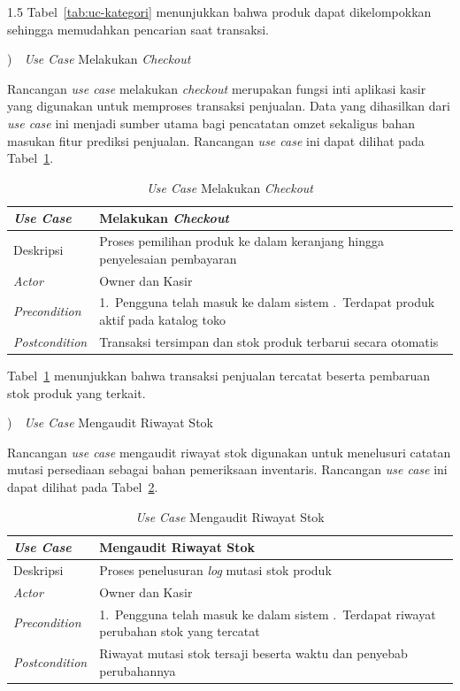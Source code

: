 \documentclass[12pt, a4paper, onecolumn, oneside]{report}
\begin{document}
\begin{spacing}{1.5}
Tabel~\ref{tab:uc-kategori} menunjukkan bahwa produk dapat dikelompokkan sehingga memudahkan pencarian saat transaksi.

)~~\textit{Use Case} Melakukan \textit{Checkout}

Rancangan \textit{use case} melakukan \textit{checkout} merupakan fungsi inti aplikasi kasir yang digunakan untuk memproses transaksi penjualan. Data yang dihasilkan dari \textit{use case} ini menjadi sumber utama bagi pencatatan omzet sekaligus bahan masukan fitur prediksi penjualan. Rancangan \textit{use case} ini dapat dilihat pada Tabel~\ref{tab:uc-checkout}.

\begin{table}[H]
\centering
\caption{\textit{Use Case} Melakukan \textit{Checkout}}
\label{tab:uc-checkout}
\begin{tabularx}{\textwidth}{|p{3.2cm}|X|}
\hline
\textbf{\textit{Use Case}} & \textbf{Melakukan \textit{Checkout}} \\ \hline
Deskripsi & Proses pemilihan produk ke dalam keranjang hingga penyelesaian pembayaran \\ \hline
\textit{Actor} & Owner dan Kasir \\ \hline
\textit{Precondition} & 1.~Pengguna telah masuk ke dalam sistem \newline 2.~Terdapat produk aktif pada katalog toko \\ \hline
\textit{Postcondition} & Transaksi tersimpan dan stok produk terbarui secara otomatis \\ \hline
\end{tabularx}
\end{table}

Tabel~\ref{tab:uc-checkout} menunjukkan bahwa transaksi penjualan tercatat beserta pembaruan stok produk yang terkait.

)~~\textit{Use Case} Mengaudit Riwayat Stok

Rancangan \textit{use case} mengaudit riwayat stok digunakan untuk menelusuri catatan mutasi persediaan sebagai bahan pemeriksaan inventaris. Rancangan \textit{use case} ini dapat dilihat pada Tabel~\ref{tab:uc-stok}.

\begin{table}[H]
\centering
\caption{\textit{Use Case} Mengaudit Riwayat Stok}
\label{tab:uc-stok}
\begin{tabularx}{\textwidth}{|p{3.2cm}|X|}
\hline
\textbf{\textit{Use Case}} & \textbf{Mengaudit Riwayat Stok} \\ \hline
Deskripsi & Proses penelusuran \textit{log} mutasi stok produk \\ \hline
\textit{Actor} & Owner dan Kasir \\ \hline
\textit{Precondition} & 1.~Pengguna telah masuk ke dalam sistem \newline 2.~Terdapat riwayat perubahan stok yang tercatat \\ \hline
\textit{Postcondition} & Riwayat mutasi stok tersaji beserta waktu dan penyebab perubahannya \\ \hline
\end{tabularx}
\end{table}


\end{spacing}
\end{document}
